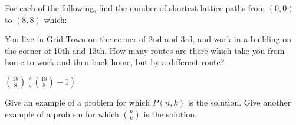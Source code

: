 \begin{squestions}
	


\question For each of the following, find the number of shortest lattice paths from $(0,0)$ to $(8,8)$ which:

	\begin{answer}
	\end{answer}
	
	


\question You live in Grid-Town on the corner of 2nd and 3rd, and work in a building on the corner of 10th and 13th.  How many routes are there which take you from home to work and then back home, but by a different route?

	\begin{answer}
		 ${18 \choose 8}\left({18 \choose 8} - 1\right)$ 
	\end{answer}
	
	


\question Give an example of a problem for which $P(n,k)$ is the solution.  Give another example of a problem for which ${n\choose k}$ is the solution.


\end{squestions}
